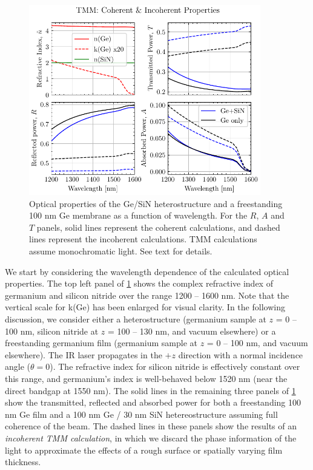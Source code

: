 \begin{figure}
	\centering
	\includegraphics[width=0.9\textwidth]{figures/chap4/tmm_vs_WL_1200-1600nm.pdf}
	\caption{Optical properties of the Ge/SiN heterostructure and a freestanding 100 nm Ge membrane as a function of wavelength. For the $R$, $A$ and $T$ panels, solid lines represent the coherent calculations, and dashed lines represent the incoherent calculations. TMM calculations assume monochromatic light. See text for details.}
	\label{fig:tmm_vs_WL_1200-1600nm}
\end{figure}

We start by considering the wavelength dependence of the calculated optical properties. The top left panel of \cref{fig:tmm_vs_WL_1200-1600nm} shows the complex refractive index of germanium and silicon nitride over the range 1200 -- 1600 nm. Note that the vertical scale for k(Ge) has been enlarged for visual clarity. In the following discussion, we consider either a heterostructure (germanium sample at {$z$ = 0 -- 100 nm}, silicon nitride at {$z$ = 100 -- 130 nm}, and vacuum elsewhere) or a freestanding germanium film (germanium sample at {$z$ = 0 -- 100 nm}, and vacuum elsewhere). The IR laser propagates in the $+z$ direction with a normal incidence angle ($\theta = 0$). The refractive index for silicon nitride is effectively constant over this range, and germanium's index is well-behaved below 1520 nm (near the direct bandgap at 1550 nm). The solid lines in the remaining three panels of \cref{fig:tmm_vs_WL_1200-1600nm} show the transmitted, reflected and absorbed power for both a freestanding 100 nm Ge film and a 100 nm Ge / 30 nm SiN hetereostructure assuming full coherence of the beam. The dashed lines in these panels show the results of an \textit{incoherent TMM calculation}, in which we discard the phase information of the light to approximate the effects of a rough surface or spatially varying film thickness.

